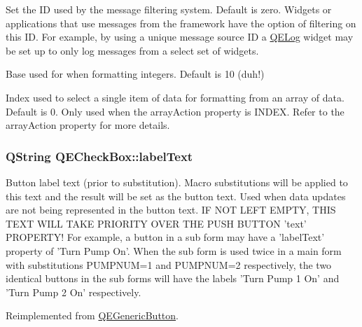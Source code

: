 \label{classQECheckBox_a138cbbabbe82d3c60e9afd8e6f53d778}
Set the ID used by the message filtering system. Default is zero. Widgets or applications that use messages from the framework have the option of filtering on this ID. For example, by using a unique message source ID a \hyperlink{classQELog}{QELog} widget may be set up to only log messages from a select set of widgets.

Base used for when formatting integers. Default is 10 (duh!)

Index used to select a single item of data for formatting from an array of data. Default is 0. Only used when the arrayAction property is INDEX. Refer to the arrayAction property for more details. \hypertarget{classQECheckBox_a4b5068740488c987e3613ed24c450da6}{
\subsubsection[{labelText}]{\setlength{\rightskip}{0pt plus 5cm}QString QECheckBox::labelText}}
\label{classQECheckBox_a4b5068740488c987e3613ed24c450da6}
Button label text (prior to substitution). Macro substitutions will be applied to this text and the result will be set as the button text. Used when data updates are not being represented in the button text. IF NOT LEFT EMPTY, THIS TEXT WILL TAKE PRIORITY OVER THE PUSH BUTTON 'text' PROPERTY! For example, a button in a sub form may have a 'labelText' property of 'Turn Pump  On'. When the sub form is used twice in a main form with substitutions PUMPNUM=1 and PUMPNUM=2 respectively, the two identical buttons in the sub forms will have the labels 'Turn Pump 1 On' and 'Turn Pump 2 On' respectively. 

Reimplemented from \hyperlink{classQEGenericButton}{QEGenericButton}.

